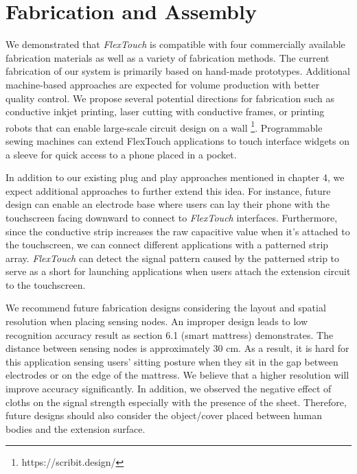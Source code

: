 \section{Fabrication and Assembly}
We demonstrated that \textit{FlexTouch} is compatible with four commercially available fabrication materials as well as a variety of fabrication methods. The current fabrication of our system is primarily based on hand-made prototypes. Additional machine-based approaches are expected for volume production with better quality control. We propose several potential directions for fabrication such as conductive inkjet printing, laser cutting with conductive frames, or printing robots that can enable large-scale circuit design on a wall \footnote{https://scribit.design/}. Programmable sewing machines can extend FlexTouch applications to touch interface widgets on a sleeve for quick access to a phone placed in a pocket.

In addition to our existing plug and play approaches mentioned in chapter 4, we expect additional approaches to further extend this idea. For instance, future design can enable an electrode base where users can lay their phone with the touchscreen facing downward to connect to \textit{FlexTouch} interfaces. Furthermore, since the conductive strip increases the raw capacitive value when it's attached to the touchscreen, we can connect different applications with a patterned strip array. \textit{FlexTouch} can detect the signal pattern caused by the patterned strip to serve as a short for launching applications when users attach the extension circuit to the touchscreen.

We recommend future fabrication designs considering the layout and spatial resolution when placing sensing nodes. An improper design leads to low recognition accuracy result as section 6.1 (smart mattress) demonstrates. The distance between sensing nodes is approximately 30 cm. As a result, it is hard for this application sensing users' sitting posture when they sit in the gap between electrodes or on the edge of the mattress. We believe that a higher resolution will improve accuracy significantly. In addition, we observed the negative effect of cloths on the signal strength especially with the presence of the sheet. Therefore, future designs should also consider the object/cover placed between human bodies and the extension surface.

